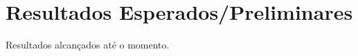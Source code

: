\chapter{Resultados Esperados/Preliminares}
\label{cap:resultados}

Resultados alcançados até o momento.
